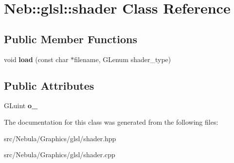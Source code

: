 \hypertarget{classNeb_1_1glsl_1_1shader}{\section{\-Neb\-:\-:glsl\-:\-:shader \-Class \-Reference}
\label{classNeb_1_1glsl_1_1shader}
}
\subsection*{\-Public \-Member \-Functions}
\begin{DoxyCompactItemize}
\item 
\hypertarget{classNeb_1_1glsl_1_1shader_aa0ae036b0adc5c8e21e87e1120bc813d}{void {\bfseries load} (const char $\ast$filename, \-G\-Lenum shader\-\_\-type)}\label{classNeb_1_1glsl_1_1shader_aa0ae036b0adc5c8e21e87e1120bc813d}

\end{DoxyCompactItemize}
\subsection*{\-Public \-Attributes}
\begin{DoxyCompactItemize}
\item 
\hypertarget{classNeb_1_1glsl_1_1shader_ac24c1c0ce93ef83fb0fa36862d003993}{\-G\-Luint {\bfseries o\-\_\-}}\label{classNeb_1_1glsl_1_1shader_ac24c1c0ce93ef83fb0fa36862d003993}

\end{DoxyCompactItemize}


\-The documentation for this class was generated from the following files\-:\begin{DoxyCompactItemize}
\item 
src/\-Nebula/\-Graphics/glsl/shader.\-hpp\item 
src/\-Nebula/\-Graphics/glsl/shader.\-cpp\end{DoxyCompactItemize}

